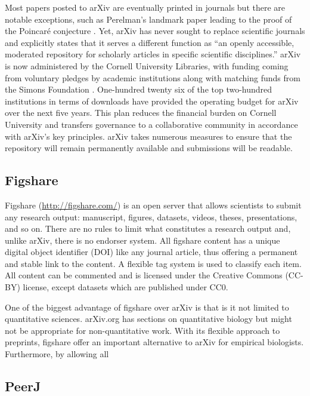 \documentclass[letterpaper,twocolumn,superscriptaddress,showkeys]{revtex4-1}
\begin{document}
Most papers posted to arXiv are eventually printed in journals but there are
notable exceptions, such as Perelman's landmark paper leading to the proof of
the Poincar\'{e} conjecture \cite{2002math.....11159P}. Yet, arXiv has never
sought to replace scientific journals and explicitly states that it serves a
different function as ``an openly accessible, moderated repository for scholarly
articles in specific scientific disciplines.'' arXiv is now administered by the
Cornell University Libraries, with funding coming from voluntary pledges by academic
institutions along with matching funds from the Simons Foundation
\cite{arxiv_future}.  One-hundred twenty six of the top two-hundred institutions
in terms of downloads have provided the operating budget for arXiv over the next
five years.  This plan reduces the financial burden on Cornell University and
transfers governance to a collaborative community in accordance with arXiv's key
principles.  arXiv takes numerous measures to ensure that the repository will
remain permanently available and submissions will be readable.

\subsection{Figshare}

Figshare (\href{http://figshare.com/}{http://figshare.com/}) is an open server
that allows scientists to submit any research output: manuscript, figures,
datasets, videos, theses, presentations, and so on. There are no rules to limit
what constitutes a research output and, unlike arXiv, there is no endorser
system. All figshare content has a unique digital object identifier (DOI) like
any journal article, thus offering a permanent and stable link to the content.
A flexible tag system is used to classify each item. All content can be
commented and is licensed under the Creative Commons (CC-BY) license, except
datasets which are published under CC0.

One of the biggest advantage of figshare over arXiv is that is it not limited to
quantitative sciences. arXiv.org has sections on quantitative biology but might
not be appropriate for non-quantitative work. With its flexible approach to
preprints, figshare offer an important alternative to arXiv for empirical
biologists. Furthermore, by allowing all 

\subsection{PeerJ}
\end{document}
